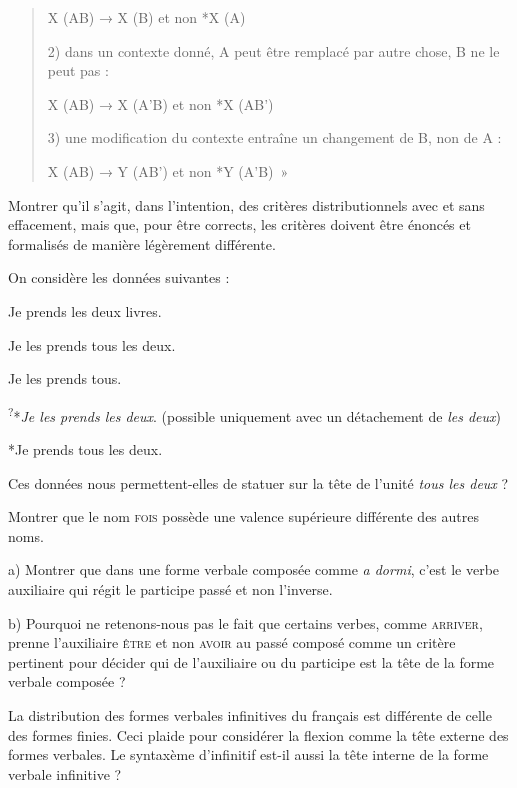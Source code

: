 {\begin{quote}
        X (AB) → X (B) et non *X (A)

    2) dans un contexte donné, A peut être remplacé par autre chose, B ne le peut pas :

        X (AB) → X (A’B) et non *X (AB’)

    3) une modification du contexte entraîne un changement de B, non de A :

        X (AB) → Y (AB’) et non *Y (A’B)~»
    \end{quote}

    Montrer qu’il s’agit, dans l’intention, des critères distributionnels avec et sans effacement, mais que, pour être corrects, les critères doivent être énoncés et formalisés de manière légèrement différente.

     On considère les données suivantes :

    \ea
    {Je prends les deux livres.}
    \z

    \z

    \ea
    {Je les prends tous les deux}.
    \z

    \ea
    {Je les prends tous.}
    \z

    \ea
    \textsuperscript{?}*\textit{Je les prends les deux}. (possible uniquement avec un détachement de \textit{les deux})
    \z

    \ea
    *{Je prends tous les deux}.
    \z

    Ces données nous permettent-elles de statuer sur la tête de l’unité \textit{tous les deux} ?

     Montrer que le nom \textsc{fois} possède une valence supérieure différente des autres noms.

     a) Montrer que dans une forme verbale composée comme \textit{a dormi}, c’est le verbe auxiliaire qui régit le participe passé et non l’inverse.

    b) Pourquoi ne retenons-nous pas le fait que certains verbes, comme \textsc{arriver}, prenne l’auxiliaire \textsc{être} et non \textsc{avoir} au passé composé comme un critère pertinent pour décider qui de l’auxiliaire ou du participe est la tête de la forme verbale composée ?

     La distribution des formes verbales infinitives du français est différente de celle des formes finies. Ceci plaide pour considérer la flexion comme la tête externe des formes verbales. Le syntaxème d’infinitif est-il aussi la tête interne de la forme verbale infinitive ?

}
